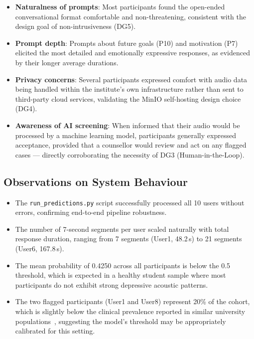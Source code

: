 \begin{itemize}
    \item \textbf{Naturalness of prompts}: Most participants found the open-ended conversational format comfortable and non-threatening, consistent with the design goal of non-intrusiveness (DG5).
    \item \textbf{Prompt depth}: Prompts about future goals (P10) and motivation (P7) elicited the most detailed and emotionally expressive responses, as evidenced by their longer average durations.
    \item \textbf{Privacy concerns}: Several participants expressed comfort with audio data being handled within the institute's own infrastructure rather than sent to third-party cloud services, validating the MinIO self-hosting design choice (DG4).
    \item \textbf{Awareness of AI screening}: When informed that their audio would be processed by a machine learning model, participants generally expressed acceptance, provided that a counsellor would review and act on any flagged cases — directly corroborating the necessity of DG3 (Human-in-the-Loop).
\end{itemize}

\subsection{Observations on System Behaviour}

\begin{itemize}
    \item The \texttt{run\_predictions.py} script successfully processed all 10 users without errors, confirming end-to-end pipeline robustness.
    \item The number of 7-second segments per user scaled naturally with total response duration, ranging from 7 segments (User1, 48.2\,s) to 21 segments (User6, 167.8\,s).
    \item The mean probability of 0.4250 across all participants is below the 0.5 threshold, which is expected in a healthy student sample where most participants do not exhibit strong depressive acoustic patterns.
    \item The two flagged participants (User1 and User8) represent 20\% of the cohort, which is slightly below the clinical prevalence reported in similar university populations~\cite{BlackDeer2023}, suggesting the model's threshold may be appropriately calibrated for this setting.
\end{itemize}

